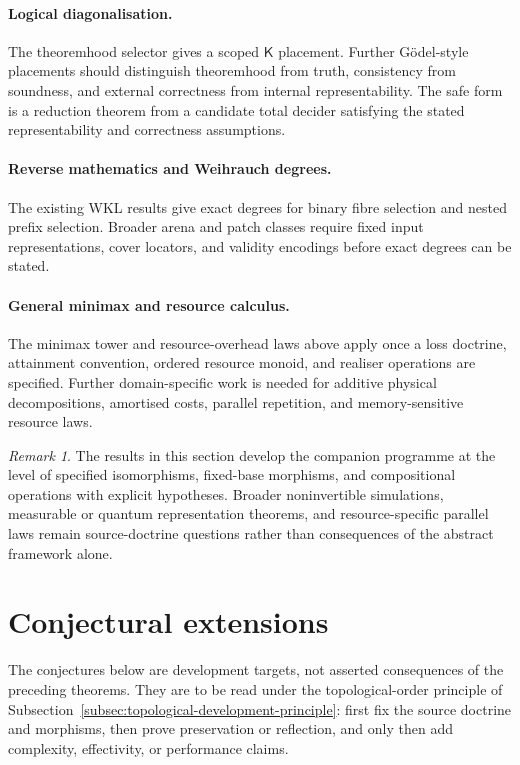 \documentclass[11pt]{article}
\theoremstyle{plain}
\theoremstyle{definition}
\theoremstyle{remark}
\newtheorem{remark}[theorem]{Remark}
\begin{document}
\paragraph{Logical diagonalisation.}
The theoremhood selector gives a scoped $\mathsf K$ placement. Further
Gödel-style placements should distinguish theoremhood from truth, consistency
from soundness, and external correctness from internal representability. The safe
form is a reduction theorem from a candidate total decider satisfying the stated
representability and correctness assumptions.

\paragraph{Reverse mathematics and Weihrauch degrees.}
The existing WKL results give exact degrees for binary fibre selection and nested
prefix selection. Broader arena and patch classes require fixed input
representations, cover locators, and validity encodings before exact degrees can
be stated.

\paragraph{General minimax and resource calculus.}
The minimax tower and resource-overhead laws above apply once a loss doctrine,
attainment convention, ordered resource monoid, and realiser operations are
specified. Further domain-specific work is needed for additive physical
decompositions, amortised costs, parallel repetition, and memory-sensitive
resource laws.

\begin{remark}
The results in this section develop the companion programme at the level of
specified isomorphisms, fixed-base morphisms, and compositional operations with
explicit hypotheses. Broader noninvertible simulations, measurable or quantum
representation theorems, and resource-specific parallel laws remain
source-doctrine questions rather than consequences of the abstract framework
alone.
\end{remark}

\section{Conjectural extensions}\label{sec:conjectures}

The conjectures below are development targets, not asserted consequences of the
preceding theorems. They are to be read under the topological-order principle of
Subsection~\ref{subsec:topological-development-principle}: first fix the source
doctrine and morphisms, then prove preservation or reflection, and only then add
complexity, effectivity, or performance claims.
\end{document}

